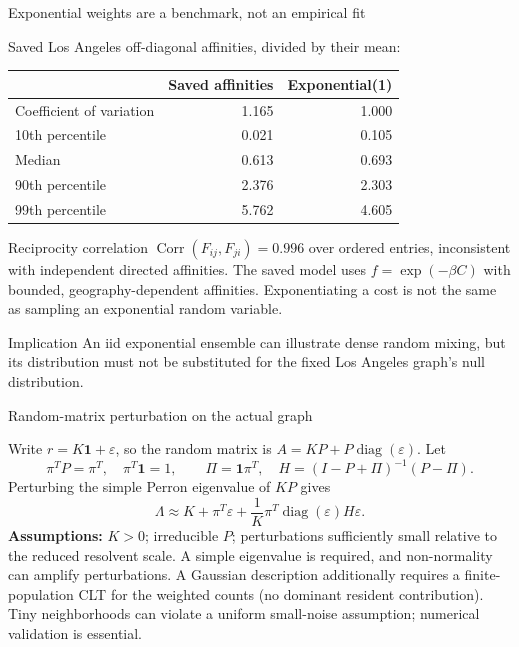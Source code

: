 \begin{frame}{Exponential weights are a benchmark, not an empirical fit}
\small

Saved Los Angeles off-diagonal affinities, divided by their mean:
\begin{center}\begin{tabular}{lrr}
 & Saved affinities & Exponential(1)\\\hline
Coefficient of variation & 1.165 & 1.000\\
10th percentile & 0.021 & 0.105\\
Median & 0.613 & 0.693\\
90th percentile & 2.376 & 2.303\\
99th percentile & 5.762 & 4.605\\
\end{tabular}\end{center}
\medskip
Reciprocity correlation $\operatorname{Corr}(F_{ij},F_{ji})=0.996$ over ordered entries, inconsistent with independent directed affinities.
\medskip
The saved model uses $f=\exp(-\beta C)$ with bounded, geography-dependent affinities. Exponentiating a cost is not the same as sampling an exponential random variable.
\begin{block}{Implication}
An iid exponential ensemble can illustrate dense random mixing, but its distribution must not be substituted for the fixed Los Angeles graph's null distribution.
\end{block}

\end{frame}

\begin{frame}{Random-matrix perturbation on the actual graph}
\small

Write $r=K\mathbf1+\varepsilon$, so the random matrix is
$A=KP+P\operatorname{diag}(\varepsilon)$. Let
\[
 \pi^TP=\pi^T,\quad\pi^T\mathbf1=1,\qquad
 \Pi=\mathbf1\pi^T,\quad
 H=(I-P+\Pi)^{-1}(P-\Pi).
\]
Perturbing the simple Perron eigenvalue of $KP$ gives
\[
 \boxed{\Lambda\approx K+\pi^T\varepsilon+
 \frac1K\pi^T\operatorname{diag}(\varepsilon)H\varepsilon.}
\]
\textbf{Assumptions:} $K>0$; irreducible $P$; perturbations sufficiently small relative to the reduced resolvent scale. A simple eigenvalue is required, and non-normality can amplify perturbations.
\medskip
A Gaussian description additionally requires a finite-population CLT for the weighted counts (no dominant resident contribution). Tiny neighborhoods can violate a uniform small-noise assumption; numerical validation is essential.

\end{frame}

